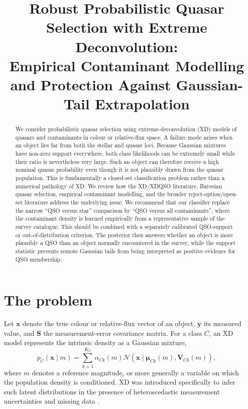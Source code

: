 \documentclass[11pt]{article}
\title{Robust Probabilistic Quasar Selection with Extreme Deconvolution:\\
Empirical Contaminant Modelling and Protection Against Gaussian-Tail Extrapolation}
\author{}
\date{}
\begin{document}
\maketitle

\begin{abstract}
We consider probabilistic quasar selection using extreme-deconvolution (XD)
models of quasars and contaminants in colour or relative-flux space. A
failure mode arises when an object lies far from both the stellar and quasar
loci. Because Gaussian mixtures have non-zero support everywhere, both class
likelihoods can be extremely small while their ratio is nevertheless very
large. Such an object can therefore receive a high nominal quasar probability
even though it is not plausibly drawn from the quasar population. This is
fundamentally a closed-set classification problem rather than a numerical
pathology of XD. We review how the XD/XDQSO literature, Bayesian quasar
selection, empirical contaminant modelling, and the broader
reject-option/open-set literature address the underlying issue. We recommend
that our classifier replace the narrow ``QSO versus star'' comparison by
``QSO versus all contaminants'', where the contaminant density is learned
empirically from a representative sample of the survey catalogue. This should
be combined with a separately calibrated QSO-support or out-of-distribution
criterion. The posterior then answers whether an object is more plausibly a
QSO than an object normally encountered in the survey, while the support
statistic prevents remote Gaussian tails from being interpreted as positive
evidence for QSO membership.
\end{abstract}

\section{The problem}

Let $\bm{x}$ denote the true colour or relative-flux vector of an object,
$\bm{y}$ its measured value, and $\bm{S}$ the measurement-error covariance
matrix. For a class $C$, an XD model represents the intrinsic density as a
Gaussian mixture,
%
\begin{equation}
p_C(\bm{x}\mid m)
=
\sum_{k=1}^{K_C}
\alpha_{Ck}(m)
\mathcal{N}
\left(
\bm{x}\mid
\bm{\mu}_{Ck}(m),
\bm{V}_{Ck}(m)
\right),
\end{equation}
%
where $m$ denotes a reference magnitude, or more generally a variable on
which the population density is conditioned. XD was introduced specifically
to infer such latent distributions in the presence of heteroscedastic
measurement uncertainties and missing data \citep{bovy2011xd}.
\end{document}
